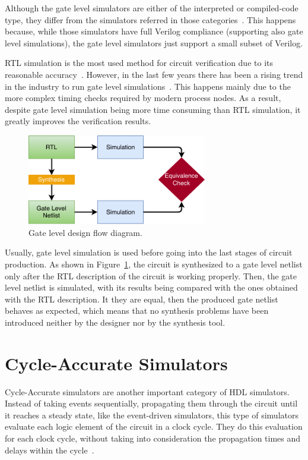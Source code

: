 Although the gate level simulators are either of the interpreted or
compiled-code type, they differ from the simulators referred in those
categories~\cite{tan:vhstas}. This happens because, while those simulators have
full Verilog compliance (supporting also gate level simulations), the gate level
simulators just support a small subset of Verilog.

\ac{RTL} simulation is the most used method for circuit verification due to its
reasonable accuracy~\cite{sousa:reconfigurable}. However, in the last few years
there has been a rising trend in the industry to run gate level
simulations~\cite{khandelwal:gatelevel}. This happens mainly due to the more
complex timing checks required by modern process nodes. As a result, despite
gate level simulation being more time consuming than \ac{RTL} simulation, it greatly
improves the verification results.

\begin{figure}[!htb]
	\centering
	\includegraphics[width=0.7\textwidth]{Figures/Gate-level.pdf}
	\caption{Gate level design flow diagram.}
	\label{fig:gl}
\end{figure}

Usually, gate level simulation is used before going into the last stages of
circuit production. As shown in Figure~\ref{fig:gl}, the circuit is synthesized
to a gate level netlist only after the \ac{RTL} description of the circuit is
working properly. Then, the gate level netlist is simulated, with its results
being compared with the ones obtained with the \ac{RTL} description. It they are
equal, then the produced gate netlist behaves as expected, which means that no
synthesis problems have been introduced neither by the designer nor by the
synthesis tool.

\section{Cycle-Accurate Simulators}
\label{section:cycle}

Cycle-Accurate simulators are another important category of HDL
simulators. Instead of taking events sequentially, propagating them through the
circuit until it reaches a steady state, like the event-driven simulators, this
type of simulators evaluate each logic element of the circuit in a clock
cycle. They do this evaluation for each clock cycle, without taking into
consideration the propagation times and delays within the
cycle~\cite{khandelwal:gatelevel}.

